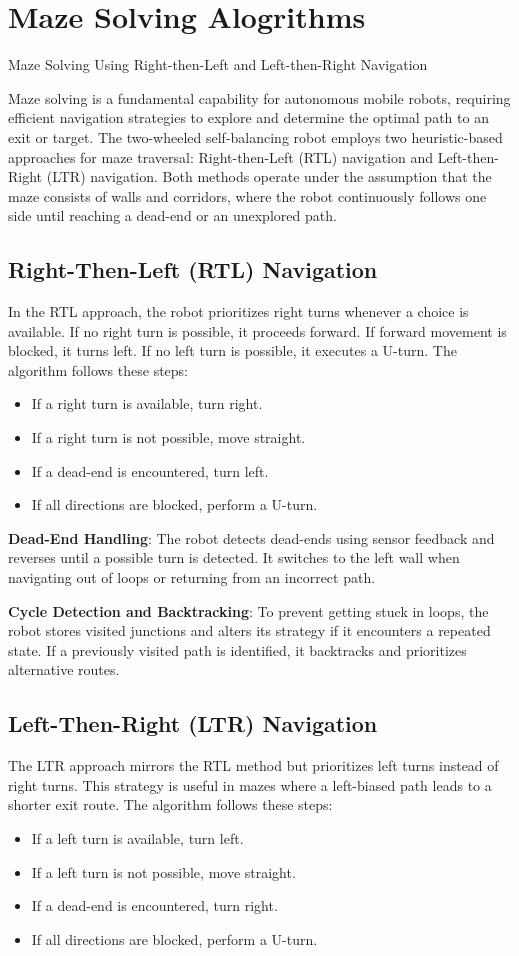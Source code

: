 \section{Maze Solving Alogrithms}
Maze Solving Using Right-then-Left and Left-then-Right Navigation

Maze solving is a fundamental capability for autonomous mobile robots, requiring efficient navigation strategies to explore and determine the optimal path to an exit or target. The two-wheeled self-balancing robot employs two heuristic-based approaches for maze traversal: Right-then-Left (RTL) navigation and Left-then-Right (LTR) navigation. Both methods operate under the assumption that the maze consists of walls and corridors, where the robot continuously follows one side until reaching a dead-end or an unexplored path.

\subsection{Right-Then-Left (RTL) Navigation}
In the RTL approach, the robot prioritizes right turns whenever a choice is available. If no right turn is possible, it proceeds forward. If forward movement is blocked, it turns left. If no left turn is possible, it executes a U-turn. The algorithm follows these steps:
\begin{itemize}
	\item If a right turn is available, turn right.
	\item If a right turn is not possible, move straight.
	\item If a dead-end is encountered, turn left.
	\item If all directions are blocked, perform a U-turn.
\end{itemize}

\textbf{Dead-End Handling}:
The robot detects dead-ends using sensor feedback and reverses until a possible turn is detected.
It switches to the left wall when navigating out of loops or returning from an incorrect path.

\textbf{Cycle Detection and Backtracking}:
To prevent getting stuck in loops, the robot stores visited junctions and alters its strategy if it encounters a repeated state.
If a previously visited path is identified, it backtracks and prioritizes alternative routes.

\subsection{Left-Then-Right (LTR) Navigation}
The LTR approach mirrors the RTL method but prioritizes left turns instead of right turns. This strategy is useful in mazes where a left-biased path leads to a shorter exit route. The algorithm follows these steps:
\begin{itemize}
	\item If a left turn is available, turn left.
	\item If a left turn is not possible, move straight.
	\item If a dead-end is encountered, turn right.
	\item If all directions are blocked, perform a U-turn.
\end{itemize}

